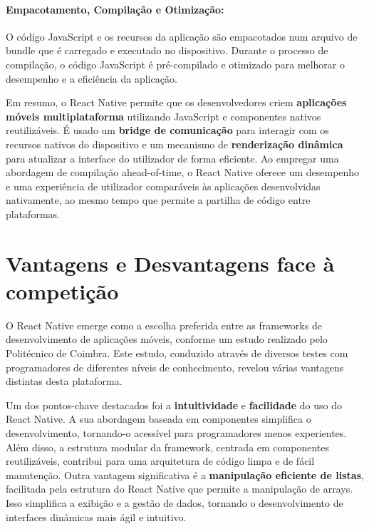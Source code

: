 \documentclass[runningheads]{llncs}
\begin{document}
\paragraph{\textbf{Empacotamento, Compilação e Otimização:}}
 O código JavaScript e os recursos da aplicação são empacotados num arquivo de bundle que é carregado e executado no dispositivo. Durante o processo de compilação, o código JavaScript é pré-compilado e otimizado para melhorar o desempenho e a eficiência da aplicação.

 \vspace{3mm}

Em resumo, o React Native permite que os desenvolvedores criem \textbf{aplicações móveis multiplataforma} utilizando JavaScript e componentes nativos reutilizáveis. É usado um \textbf{bridge de comunicação} para interagir com os recursos nativos do dispositivo e um mecanismo de \textbf{renderização dinâmica} para atualizar a interface do utilizador de forma eficiente. Ao empregar uma abordagem de compilação ahead-of-time, o React Native oferece um desempenho e uma experiência de utilizador comparáveis às aplicações desenvolvidas nativamente, ao mesmo tempo que permite a partilha de código entre plataformas.

\section{Vantagens e Desvantagens face à competição}
O React Native emerge como a escolha preferida entre as frameworks de desenvolvimento de aplicações móveis, conforme um estudo realizado pelo Politécnico de Coimbra. Este estudo, conduzido através de diversos testes com programadores de diferentes níveis de conhecimento, revelou várias vantagens distintas desta plataforma.

\vspace{3mm}

Um dos pontos-chave destacados foi a \textbf{intuitividade} e \textbf{facilidade} do uso do React Native. A sua abordagem baseada em componentes simplifica o desenvolvimento, tornando-o acessível para programadores menos experientes. Além disso, a estrutura modular da framework, centrada em componentes reutilizáveis, contribui para uma arquitetura de código limpa e de fácil manutenção.
Outra vantagem significativa é a \textbf{manipulação eficiente de listas}, facilitada pela estrutura do React Native que permite a manipulação de arrays. Isso simplifica a exibição e a gestão de dados, tornando o desenvolvimento de interfaces dinâmicas mais ágil e intuitivo.
\end{document}

